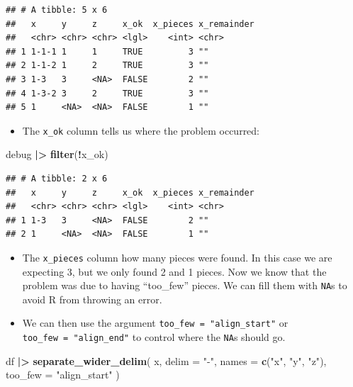 \documentclass[
]{article}
\newenvironment{Shaded}{\begin{snugshade}}{\end{snugshade}}
\newcommand{\AttributeTok}[1]{\textcolor[rgb]{0.13,0.29,0.53}{#1}}
\newcommand{\FunctionTok}[1]{\textcolor[rgb]{0.13,0.29,0.53}{\textbf{#1}}}
\newcommand{\NormalTok}[1]{#1}
\newcommand{\SpecialCharTok}[1]{\textcolor[rgb]{0.81,0.36,0.00}{\textbf{#1}}}
\newcommand{\StringTok}[1]{\textcolor[rgb]{0.31,0.60,0.02}{#1}}
\providecommand{\tightlist}{%
  \setlength{\itemsep}{0pt}\setlength{\parskip}{0pt}}
\begin{document}
\begin{verbatim}
## # A tibble: 5 x 6
##   x     y     z     x_ok  x_pieces x_remainder
##   <chr> <chr> <chr> <lgl>    <int> <chr>      
## 1 1-1-1 1     1     TRUE         3 ""         
## 2 1-1-2 1     2     TRUE         3 ""         
## 3 1-3   3     <NA>  FALSE        2 ""         
## 4 1-3-2 3     2     TRUE         3 ""         
## 5 1     <NA>  <NA>  FALSE        1 ""
\end{verbatim}

\begin{itemize}
\tightlist
\item
  The \texttt{x\_ok} column tells us where the problem occurred:
\end{itemize}

\begin{Shaded}
\begin{Highlighting}[]
\NormalTok{debug }\SpecialCharTok{|\textgreater{}} \FunctionTok{filter}\NormalTok{(}\SpecialCharTok{!}\NormalTok{x\_ok)}
\end{Highlighting}
\end{Shaded}

\begin{verbatim}
## # A tibble: 2 x 6
##   x     y     z     x_ok  x_pieces x_remainder
##   <chr> <chr> <chr> <lgl>    <int> <chr>      
## 1 1-3   3     <NA>  FALSE        2 ""         
## 2 1     <NA>  <NA>  FALSE        1 ""
\end{verbatim}

\begin{itemize}
\tightlist
\item
  The \texttt{x\_pieces} column how many pieces were found. In this case
  we are expecting 3, but we only found 2 and 1 pieces. Now we know that
  the problem was due to having ``too\_few'' pieces. We can fill them
  with \texttt{NA}s to avoid R from throwing an error.\\
\item
  We can then use the argument \texttt{too\_few\ =\ "align\_start"} or
  \texttt{too\_few\ =\ "align\_end"} to control where the \texttt{NA}s
  should go.
\end{itemize}

\begin{Shaded}
\begin{Highlighting}[]
\NormalTok{df }\SpecialCharTok{|\textgreater{}} 
  \FunctionTok{separate\_wider\_delim}\NormalTok{(}
\NormalTok{    x,}
    \AttributeTok{delim =} \StringTok{"{-}"}\NormalTok{,}
    \AttributeTok{names =} \FunctionTok{c}\NormalTok{(}\StringTok{"x"}\NormalTok{, }\StringTok{"y"}\NormalTok{, }\StringTok{"z"}\NormalTok{),}
    \AttributeTok{too\_few =} \StringTok{"align\_start"}
\NormalTok{  )}
\end{Highlighting}
\end{Shaded}
\end{document}
